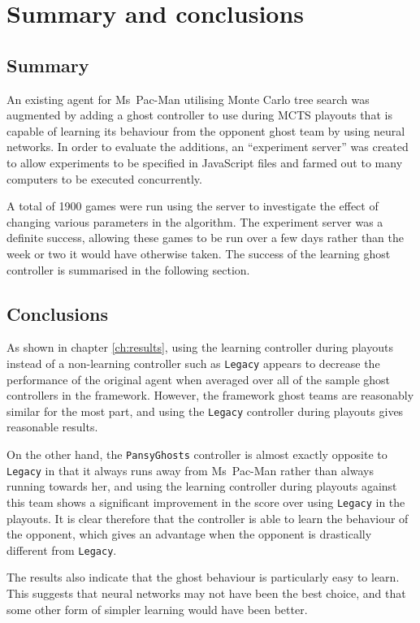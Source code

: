 \chapter{Summary and conclusions}
\label{ch:summary}

\section{Summary}
An existing agent for Ms~Pac-Man utilising Monte Carlo tree search was augmented by adding a ghost controller to use during MCTS playouts that is capable of learning its behaviour from the opponent ghost team by using neural networks.  In order to evaluate the additions, an ``experiment server'' was created to allow experiments to be specified in JavaScript files and farmed out to many computers to be executed concurrently.

A total of 1900 games were run using the server to investigate the effect of changing various parameters in the algorithm.  The experiment server was a definite success, allowing these games to be run over a few days rather than the week or two it would have otherwise taken.  The success of the learning ghost controller is summarised in the following section.

\section{Conclusions}

As shown in chapter \ref{ch:results}, using the learning controller during playouts instead of a non-learning controller such as {\tt Legacy} appears to decrease the performance of the original agent when averaged over all of the sample ghost controllers in the framework.  However, the framework ghost teams are reasonably similar for the most part, and using the {\tt Legacy} controller during playouts gives reasonable results.

On the other hand, the {\tt PansyGhosts} controller is almost exactly opposite to {\tt Legacy} in that it always runs away from Ms~Pac-Man rather than always running towards her, and using the learning controller during playouts against this team shows a significant improvement in the score over using {\tt Legacy} in the playouts.  It is clear therefore that the controller is able to learn the behaviour of the opponent, which gives an advantage when the opponent is drastically different from {\tt Legacy}.

The results also indicate that the ghost behaviour is particularly easy to learn.  This suggests that neural networks may not have been the best choice, and that some other form of simpler learning would have been better.

